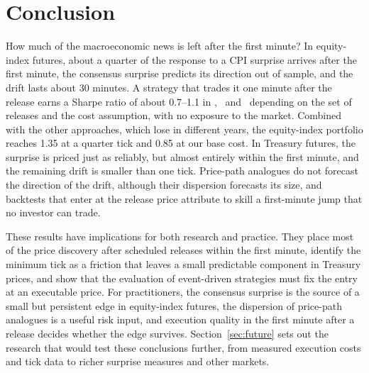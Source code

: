 \section{Conclusion}\label{sec:conclusion}

How much of the macroeconomic news is left after the first minute? In equity-index futures, about
a quarter of the response to a CPI surprise arrives after the first minute, the consensus surprise
predicts its direction out of sample, and the drift lasts about 30 minutes. A strategy that trades
it one minute after the release earns a Sharpe ratio of about 0.7--1.1 in \ES, \NQ\ and \YM\ depending on
the set of releases and the cost assumption, with no exposure to the market. Combined with the
other approaches, which lose in different years, the equity-index portfolio reaches 1.35 at a
quarter tick and 0.85 at our base cost. In Treasury futures,
the surprise is priced just as reliably, but almost entirely within the first minute, and the
remaining drift is smaller than one tick. Price-path analogues do not forecast the direction of
the drift, although their dispersion forecasts its size, and backtests that enter at the release
price attribute to skill a first-minute jump that no investor can trade.

These results have implications for both research and practice. They place most of the price
discovery after scheduled releases within the first minute, identify the minimum tick as a
friction that leaves a small predictable component in Treasury prices, and show that the evaluation
of event-driven strategies must fix the entry at an executable price. For practitioners, the
consensus surprise is the source of a small but persistent edge in equity-index futures, the
dispersion of price-path analogues is a useful risk input, and execution quality in the first
minute after a release decides whether the edge survives. Section~\ref{sec:future} sets out the
research that would test these conclusions further, from measured execution costs and tick data to
richer surprise measures and other markets.

